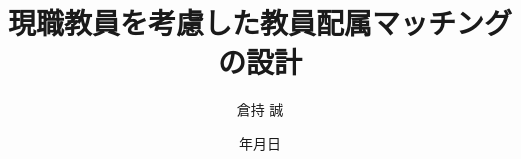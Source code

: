 \documentclass[12pt, a4paper]{article}
\renewcommand{\today}{\number\year 年\number\month 月\number\day 日} %
\theoremstyle{definition}
\theoremstyle{remark}
\theoremstyle{plain}
\begin{document}
\title{現職教員を考慮した教員配属マッチングの設計} 
\author{倉持 誠}
\date{\today} %

\maketitle %
\begin{abstract}
    \noindent %





    \vspace{1cm} %
    \noindent %

\end{abstract}
\end{document}

